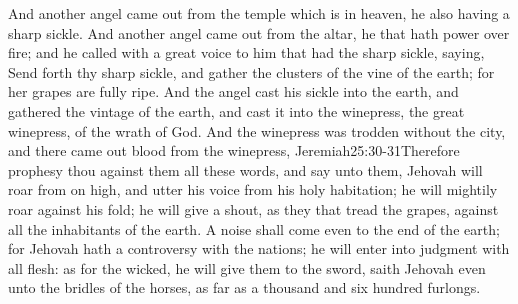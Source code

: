And another angel came out from the temple which is in heaven, he also having a sharp sickle. 
And another angel came out from the altar, he that hath power over fire; and he called with a great voice to him that had the sharp sickle, saying, Send forth thy sharp sickle, and gather the clusters of the vine of the earth; for her grapes are fully ripe. 
And the angel cast his sickle into the earth, and gathered the vintage of the earth, and cast it into the winepress, the great winepress, of the wrath of God. 
And the winepress was trodden without the city, and there came out blood from the winepress,%
				{Jeremiah}{25:30-31}{Therefore prophesy thou against them all these words, and say unto them, Jehovah will roar from on high, and utter his voice from his holy habitation; he will mightily roar against his fold; he will give a shout, as they that tread the grapes, against all the inhabitants of the earth. A noise shall come even to the end of the earth; for Jehovah hath a controversy with the nations; he will enter into judgment with all flesh: as for the wicked, he will give them to the sword, saith Jehovah}
 even unto the bridles of the horses, as far as a thousand and six hundred furlongs.
